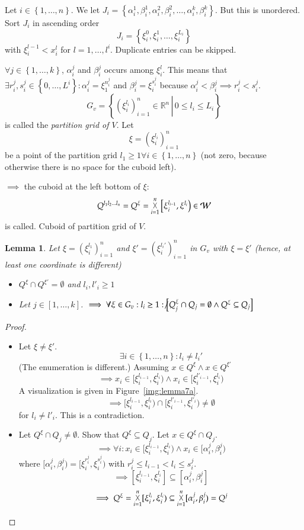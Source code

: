 \documentclass{article}
\newtheorem{lemma}{Lemma}  \numberwithin{lemma}{section}
\newcommand{\set}[1]{\left\{#1\right\}}
\newcommand{\setdef}[2]{\left\{\left.#1\,\right|\,#2\right\}}
\DeclareMathOperator*{\bigtimes}{\vartimes}
\begin{document}
Let $i \in \set{1,\ldots,n}$.
We let $J_i = \set{\alpha_i^1, \beta_i^1, \alpha_i^2, \beta_i^2, \ldots, \alpha_i^k, \beta_i^k}$.
But this is unordered. Sort $J_i$ in ascending order
\[ J_i = \set{\xi_i^0, \xi_i^1, \ldots, \xi_i^{L_i}} \]
with $\xi_i^{l-1} < x_i^l$ for $l = 1, \ldots, l^i$.
Duplicate entries can be skipped.

$\forall j \in \set{1,\ldots,k}$, $\alpha_i^j$ and $\beta_i^j$ occurs among $\xi_i^l$.
This means that $\exists r_i^j, s_i^j \in \set{0, \ldots, L^i}: \alpha_i^j = \xi_1^{n_i^j}$ and $\beta_i^j = \xi_i^{s_i^j}$
because $\alpha_i^j < \beta_i^j \implies r_i^j < s_i^j$.
\[ G_v = \setdef{(\xi_i^{l_i})_{i=1}^n \in \mathbb R^n}{0 \leq l_i \leq L_i} \]
is called the \emph{partition grid of $V$}. Let
\[ \xi = (\xi_i^{l_i})_{i=1}^n \]
be a point of the partition grid
$l_1 \geq 1 \forall i \in \set{1,\ldots,n}$ (not zero, because otherwise there is no space for the cuboid left).

$\implies$ the cuboid at the left bottom of $\xi$:
\[ Q^{l_1 l_2 \ldots l_n} = Q^\xi = \bigtimes_{i=1}^n \left[\xi_i^{l_{i-1}}, \xi^{l_i}\right) \in \mathcal W \]
is called. Cuboid of partition grid of $V$.


\begin{lemma}
  \label{l:seven}
  Let $\xi = (\xi_i^{l_1})_{i=1}^n$ and $\xi' = (\xi_i^{l_i'})_{i=1}^n$ in $G_v$ with $\xi = \xi'$ (hence, at least one coordinate is different)
  \begin{itemize}
    \item $Q^\xi \cap Q^{\xi'} = \emptyset$ and $l_i, l'_i \geq 1$
    \item Let $j \in [1,\ldots,k]$. $\implies \forall \xi \in G_v: l_i \geq 1: \not\left[Q_j^\xi \cap Q_j = \emptyset \land Q^\xi \subseteq Q_j\right]$
  \end{itemize}
\end{lemma}
\begin{proof}
  \begin{itemize}
    \item
      Let $\xi \neq \xi'$.
      \[ \exists i \in \set{1,\ldots,n}: l_i \neq l_i' \]
      (The enumeration is different.) Assuming $x \in Q^\xi \land x \in Q^{\xi'}$
      \[ \implies x_i \in [\xi_i^{l_{i-1}}, \xi_i^{l_i}) \land x_i \in [\xi_i^{l'_{i-1}}, \xi_i^{l_i}) \]
      A visualization is given in Figure~\ref{img:lemma7a}.
      \[ \implies [\xi_i^{l_{i-1}}, \xi_i^{l_i}) \cap [\xi_i^{l'_{i-1}}, \xi_i^{l'_i}) \neq \emptyset \]
      for $l_i \neq l'_i$. This is a contradiction.
    \item
      Let $Q^\xi \cap Q_j \neq \emptyset$. Show that $Q^\xi \subseteq Q_j$.
      Let $x \in Q^\xi \cap Q_j$.
      \[ \implies \forall i: x_i \in [\xi_{i}^{l_{i-1}}, \xi_i^{l_i}) \land x_i \in [\alpha_i^j, \beta_i^j) \]
      where $[\alpha_i^j, \beta_i^j) = [\xi_i^{r_i^j}, \xi_i^{s_i^j})$ with $r_i^j \leq l_{i-1} < l_i \leq s_i^j$.
      \[ \implies [\xi_i^{l_{i-1}}, \xi_i^{l_i}] \subseteq [\alpha_i^j, \beta_i^j] \]
      \[ \implies Q^\xi = \bigtimes_{i=1}^{n} [\xi_i^{l_i}, \xi_i^{l_i}) \subseteq \bigtimes_{i=1}^n [\alpha_i^j, \beta_i^j) = Q^j \]
  \end{itemize}
\end{proof}
\end{document}
